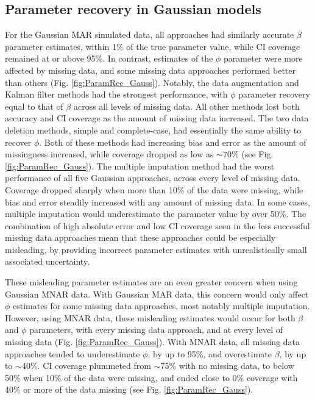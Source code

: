 \documentclass{article}
\begin{document}
\begin{linenumbers}
\subsection*{Parameter recovery in Gaussian models}
For the Gaussian MAR simulated data, all approaches had similarly accurate $\beta$ parameter estimates, within 1\% of the true parameter value, while CI coverage remained at or above 95\%. In contrast, estimates of the $\phi$ parameter were more affected by missing data, and some missing data approaches performed better than others (Fig. \ref{fig:ParamRec_Gauss}). Notably, the data augmentation and Kalman filter methods had the strongest performance, with $\phi$ parameter recovery equal to that of $\beta$ across all levels of missing data. All other methods lost both accuracy and CI coverage as the amount of missing data increased. The two data deletion methods, simple and complete-case, had essentially the same ability to recover $\phi$. Both of these methods had increasing bias and error as the amount of missingness increased, while coverage dropped as low as $\sim70\%$ (see Fig. \ref{fig:ParamRec_Gauss}). The multiple imputation method had the worst performance of all five Gaussian approaches, across every level of missing data. Coverage dropped sharply when more than 10\% of the data were missing, while bias and error steadily increased with any amount of missing data. In some cases, multiple imputation would underestimate the parameter value by over 50\%. The combination of high absolute error and low CI coverage seen in the less successful missing data approaches mean that these approaches could be especially misleading, by providing incorrect parameter estimates with unrealistically small associated uncertainty. 

These misleading parameter estimates are an even greater concern when using Gaussian MNAR data. With Gaussian MAR data, this concern would only affect $\phi$ estimates for some missing data approaches, most notably multiple imputation. However, using MNAR data, these misleading estimates would occur for both $\beta$ and $\phi$ parameters, with every missing data approach, and at every level of missing data (Fig. \ref{fig:ParamRec_Gauss}). With MNAR data, all missing data approaches tended to underestimate $\phi$, by up to 95\%, and overestimate $\beta$, by up to $\sim40\%$.  CI coverage plummeted from $\sim75\%$ with no missing data, to below 50\% when 10\% of the data were missing, and ended close to 0\% coverage with 40\% or more of the data missing (see Fig. \ref{fig:ParamRec_Gauss}). 


\end{linenumbers}
\end{document}
